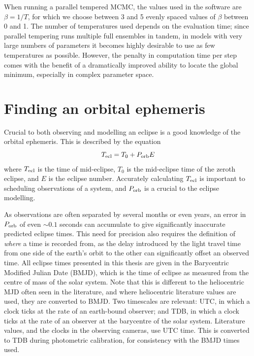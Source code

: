 When running a parallel tempered MCMC, the values used in the software are $\beta = 1/T$, for which we choose between 3 and 5 evenly spaced values of $\beta$ between 0 and 1.
The number of temperatures used depends on the evaluation time; since parallel tempering runs multiple full ensembles in tandem, in models with very large numbers of parameters it becomes highly desirable to use as few temperatures as possible. However, the penalty in computation time per step comes with the benefit of a dramatically improved ability to locate the global minimum, especially in complex parameter space.



\section{Finding an orbital ephemeris}
\label{sect:modelling:getting ephemeris}

Crucial to both observing and modelling an eclipse is a good knowledge of the orbital ephemeris. This is described by the equation
\begin{equation}
    \label{eqn:modelling:general ephemeris equation}
    T_{\rm ecl} = T_0 + P_{\rm orb} E
\end{equation}
where $T_{\rm ecl}$ is the time of mid-eclipse, $T_0$ is the mid-eclipse time of the zeroth eclipse, and $E$ is the eclipse number. Accurately calculating $T_{\rm ecl}$ is important to scheduling observations of a system, and $P_{\rm orb}$ is a crucial to the eclipse modelling.

As observations are often separated by several months or even years, an error in $P_{\rm orb}$ of even $\sim 0.1$ seconds can accumulate to give significantly inaccurate predicted eclipse times. This need for precision also requires the definition of {\it where} a time is recorded from, as the delay introduced by the light travel time from one side of the earth's orbit to the other can significantly offset an observed time. All eclipse times presented in this thesis are given in the Barycentric Modified Julian Date (BMJD), which is the time of eclipse as measured from the centre of mass of the solar system. Note that this is different to the heliocentric MJD often seen in the literature, and where heliocentric literature values are used, they are converted to BMJD.
Two timescales are relevant: UTC, in which a clock ticks at the rate of an earth-bound observer; and TDB, in which a clock ticks at the rate of an observer at the barycentre of the solar system. Literature values, and the clocks in the observing cameras, use UTC time. This is converted to TDB during photometric calibration, for consistency with the BMJD times used.

